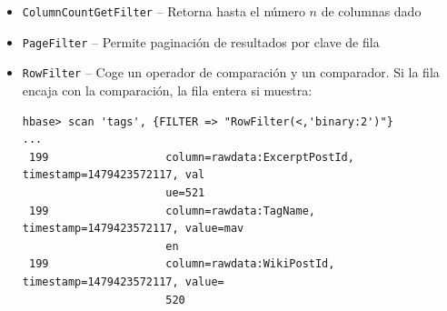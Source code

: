 \documentclass[14pt]{beamer}
\begin{document}
\begin{frame}
\begin{itemize}
\item {\tt ColumnCountGetFilter} -- Retorna hasta el número $n$ de columnas
  dado

\item {\tt PageFilter} -- Permite paginación de resultados por clave de
  fila

  \framebreak

\item {\tt RowFilter} -- Coge un operador de comparación y un comparador.
  Si la fila encaja con la comparación, la fila entera si muestra:

\begin{lstlisting}
hbase> scan 'tags', {FILTER => "RowFilter(<,'binary:2')"}
...
 199                  column=rawdata:ExcerptPostId, timestamp=1479423572117, val
                      ue=521
 199                  column=rawdata:TagName, timestamp=1479423572117, value=mav
                      en
 199                  column=rawdata:WikiPostId, timestamp=1479423572117, value=
                      520
\end{lstlisting}









\end{itemize}
\end{frame}
\end{document}
